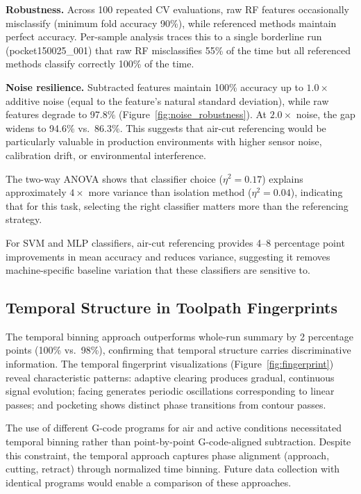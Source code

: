 \textbf{Robustness.} Across 100 repeated CV evaluations, raw RF features occasionally misclassify (minimum fold accuracy 90\%), while referenced methods maintain perfect accuracy. Per-sample analysis traces this to a single borderline run (pocket150025\_001) that raw RF misclassifies 55\% of the time but all referenced methods classify correctly 100\% of the time.

\textbf{Noise resilience.} Subtracted features maintain 100\% accuracy up to $1.0\times$ additive noise (equal to the feature's natural standard deviation), while raw features degrade to 97.8\% (Figure~\ref{fig:noise_robustness}). At $2.0\times$ noise, the gap widens to 94.6\% vs.\ 86.3\%. This suggests that air-cut referencing would be particularly valuable in production environments with higher sensor noise, calibration drift, or environmental interference.

The two-way ANOVA shows that classifier choice ($\eta^2 = 0.17$) explains approximately $4\times$ more variance than isolation method ($\eta^2 = 0.04$), indicating that for this task, selecting the right classifier matters more than the referencing strategy.

For SVM and MLP classifiers, air-cut referencing provides 4--8 percentage point improvements in mean accuracy and reduces variance, suggesting it removes machine-specific baseline variation that these classifiers are sensitive to.

\subsection{Temporal Structure in Toolpath Fingerprints}

The temporal binning approach outperforms whole-run summary by 2 percentage points (100\% vs.\ 98\%), confirming that temporal structure carries discriminative information. The temporal fingerprint visualizations (Figure~\ref{fig:fingerprint}) reveal characteristic patterns: adaptive clearing produces gradual, continuous signal evolution; facing generates periodic oscillations corresponding to linear passes; and pocketing shows distinct phase transitions from contour passes.

The use of different G-code programs for air and active conditions necessitated temporal binning rather than point-by-point G-code-aligned subtraction. Despite this constraint, the temporal approach captures phase alignment (approach, cutting, retract) through normalized time binning. Future data collection with identical programs would enable a comparison of these approaches.

